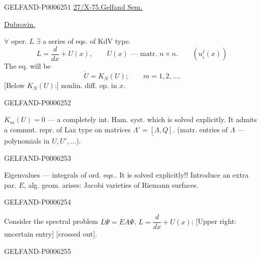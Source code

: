 \begin{GelfandAdjacentEvidence}{GELFAND-P000625}{1}
\underline{27/X-75.}\qquad\underline{Gelfand Sem.}

\underline{Dubrovin.}

\(\forall\) oper. \(L\) \(\exists\) a series of eqs. of KdV type.
\begin{equation*}
L=\frac{d}{dx}+U(x),\qquad U(x)\text{ --- matr. }n\times n.\qquad (u_i^j(x))\tag{1}
\end{equation*}
The eq. will be
\begin{equation*}
\dot U=K_N(U);\qquad m=1,2,\ldots .\tag{2}
\end{equation*}
[Below \(K_N(U)\):] nonlin. diff. op. in \(x\).
\end{GelfandAdjacentEvidence}
\begin{GelfandAdjacentEvidence}{GELFAND-P000625}{2}


\underline{\(K_m(U)=0\)} --- a completely int. Ham. syst. which is solved explicitly.
It admits a commut. repr. of Lax type on matrices \(\underline{\Lambda'=[\Lambda,Q]}\).
(matr. entries of \(\Lambda\) --- polynomials in \(U,U',\ldots\)).
\end{GelfandAdjacentEvidence}
\begin{GelfandAdjacentEvidence}{GELFAND-P000625}{3}


Eigenvalues --- integrals of ord. eqs..
It is solved explicitly!! Introduce an extra par. \(E\), alg. geom. arises:
Jacobi varieties of Riemann surfaces.
\end{GelfandAdjacentEvidence}
\begin{GelfandAdjacentEvidence}{GELFAND-P000625}{4}


Consider the spectral problem \(L\Psi=EA\Psi\), \(L=\dfrac{d}{dx}+U(x)\);
[Upper right: uncertain entry] [crossed out].
\end{GelfandAdjacentEvidence}
\begin{GelfandAdjacentEvidence}{GELFAND-P000625}{5}

\end{GelfandAdjacentEvidence}
